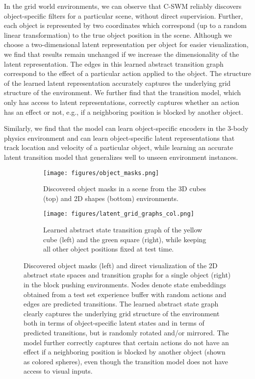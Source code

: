 \documentclass{article} %
\begin{document}
In the grid world environments, we can observe that C-SWM reliably discovers object-specific filters for a particular scene, without direct supervision. Further, each object is represented by two coordinates which correspond (up to a random linear transformation) to the true object position in the scene. Although we choose a two-dimensional latent representation per object for easier visualization, we find that results remain unchanged if we increase the dimensionality of the latent representation. The edges in this learned abstract transition graph correspond to the effect of a particular action applied to the object. The structure of the learned latent representation accurately captures the underlying grid structure of the environment. We further find that the transition model, which only has access to latent representations, correctly captures whether an action has an effect or not, e.g., if a neighboring position is blocked by another object.

Similarly, we find that the model can learn object-specific encoders in the 3-body physics environment and can learn object-specific latent representations that track location and velocity of a particular object, while learning an accurate latent transition model that generalizes well to unseen environment instances.

\begin{figure*}[t]
\centering
  \begin{subfigure}[b]{0.47\textwidth}
  \centering
    \texttt{[image: figures/object\_masks.png]}
    \caption{Discovered object masks in a scene from the 3D cubes (top) and 2D shapes (bottom) environments.}
  \end{subfigure}
  \quad
  \begin{subfigure}[b]{0.47\textwidth}
  \centering
    \texttt{[image: figures/latent\_grid\_graphs\_col.png]}
    \caption{
  Learned abstract state transition graph of the yellow cube (left) and the green square (right), while keeping all other object positions fixed at test time.}
  \end{subfigure}
  \caption{Discovered object masks (left) and direct visualization of the 2D abstract state spaces and transition graphs for a single object (right) in the block pushing environments. Nodes denote state embeddings obtained from a test set experience buffer with random actions and edges are predicted transitions. The learned abstract state graph clearly captures the underlying grid structure of the environment both in terms of object-specific latent states and in terms of predicted transitions, but is randomly rotated and/or mirrored. The model further correctly captures that certain actions do not have an effect if a neighboring position is blocked by another object (shown as colored spheres), even though the transition model does not have access to visual inputs. \label{fig:grid_world}}
\end{figure*}
\end{document}
